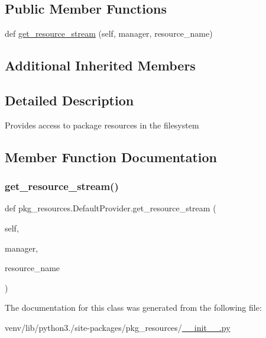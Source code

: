 \subsection*{Public Member Functions}
\begin{DoxyCompactItemize}
\item 
def \hyperlink{classpkg__resources_1_1DefaultProvider_aeb33e951bb17171389d443d9540e3201}{get\+\_\+resource\+\_\+stream} (self, manager, resource\+\_\+name)
\end{DoxyCompactItemize}
\subsection*{Additional Inherited Members}


\subsection{Detailed Description}
\begin{DoxyVerb}Provides access to package resources in the filesystem\end{DoxyVerb}
 

\subsection{Member Function Documentation}
\mbox{\label{classpkg__resources_1_1DefaultProvider_aeb33e951bb17171389d443d9540e3201}} 
\subsubsection{\texorpdfstring{get\+\_\+resource\+\_\+stream()}{get\_resource\_stream()}}
{\footnotesize\ttfamily def pkg\+\_\+resources.\+Default\+Provider.\+get\+\_\+resource\+\_\+stream (\begin{DoxyParamCaption}\item[{}]{self,  }\item[{}]{manager,  }\item[{}]{resource\+\_\+name }\end{DoxyParamCaption})}



The documentation for this class was generated from the following file\+:\begin{DoxyCompactItemize}
\item 
venv/lib/python3./site-\/packages/pkg\+\_\+resources/\hyperlink{venv_2lib_2python3_89_2site-packages_2pkg__resources_2____init_____8py}{\+\_\+\+\_\+init\+\_\+\+\_\+.\+py}\end{DoxyCompactItemize}
